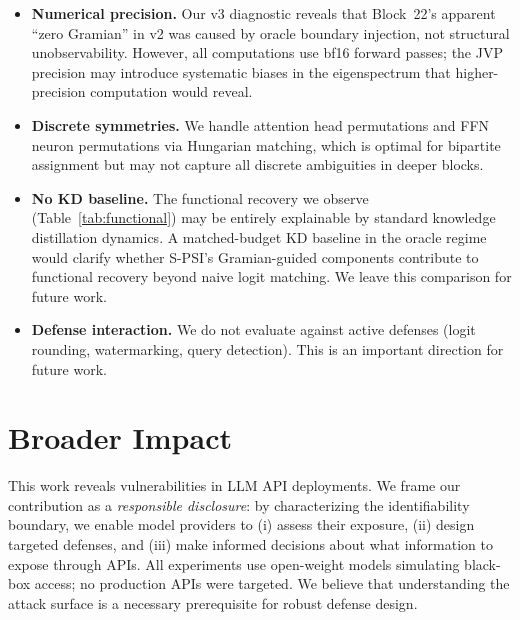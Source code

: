 \documentclass{article}
\begin{document}
\begin{itemize}
    \item \textbf{Numerical precision.}  Our v3 diagnostic reveals that Block~22's apparent ``zero Gramian'' in v2 was caused by oracle boundary injection, not structural unobservability.  However, all computations use bf16 forward passes; the JVP precision may introduce systematic biases in the eigenspectrum that higher-precision computation would reveal.
    \item \textbf{Discrete symmetries.} We handle attention head permutations and FFN neuron permutations via Hungarian matching, which is optimal for bipartite assignment but may not capture all discrete ambiguities in deeper blocks.
    \item \textbf{No KD baseline.}  The functional recovery we observe (Table~\ref{tab:functional}) may be entirely explainable by standard knowledge distillation dynamics.  A matched-budget KD baseline in the oracle regime would clarify whether S-PSI's Gramian-guided components contribute to functional recovery beyond naive logit matching.  We leave this comparison for future work.
    \item \textbf{Defense interaction.} We do not evaluate against active defenses (logit rounding, watermarking, query detection). This is an important direction for future work.
\end{itemize}


\section{Broader Impact}
\label{sec:impact}

This work reveals vulnerabilities in LLM API deployments. We frame our contribution as a \emph{responsible disclosure}: by characterizing the identifiability boundary, we enable model providers to (i) assess their exposure, (ii) design targeted defenses, and (iii) make informed decisions about what information to expose through APIs. All experiments use open-weight models simulating black-box access; no production APIs were targeted. We believe that understanding the attack surface is a necessary prerequisite for robust defense design.


\end{document}
